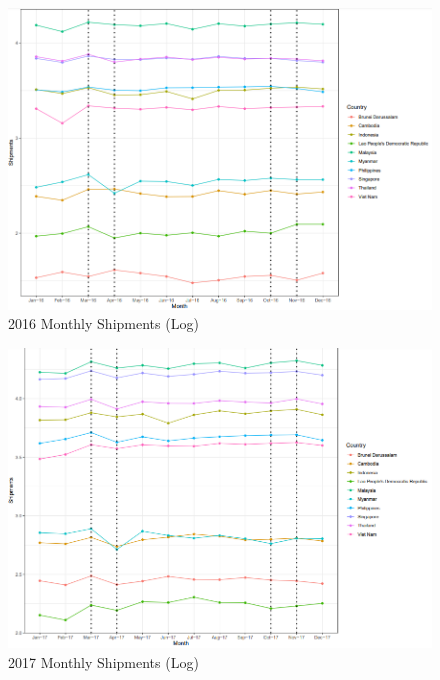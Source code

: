\documentclass{article}
\begin{document}
\begin{figure}[H]
\centering
\includegraphics[width=1\textwidth]{images/Line Plots/Seasonal/2016_seasonal_log.png}
\caption{2016 Monthly Shipments (Log)}
\end{figure}

\begin{figure}[H]
\centering
\includegraphics[width=1\textwidth]{images/Line Plots/Seasonal/2017_seasonal_log.png}
\caption{2017 Monthly Shipments (Log)}
\end{figure}
\end{document}
